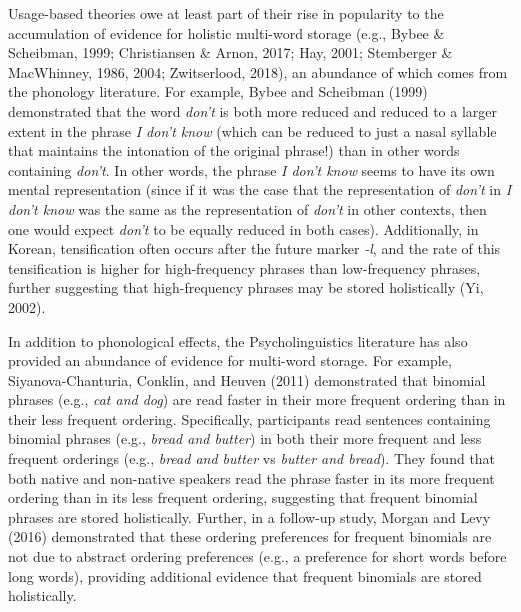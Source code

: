 \documentclass[
  man,floatsintext]{apa6}
\begin{document}
Usage-based theories owe at least part of their rise in popularity to the accumulation of evidence for holistic multi-word storage (e.g., Bybee \& Scheibman, 1999; Christiansen \& Arnon, 2017; Hay, 2001; Stemberger \& MacWhinney, 1986, 2004; Zwitserlood, 2018), an abundance of which comes from the phonology literature. For example, Bybee and Scheibman (1999) demonstrated that the word \emph{don't} is both more reduced and reduced to a larger extent in the phrase \emph{I don't know} (which can be reduced to just a nasal syllable that maintains the intonation of the original phrase!) than in other words containing \emph{don't}. In other words, the phrase \emph{I don't know} seems to have its own mental representation (since if it was the case that the representation of \emph{don't} in \emph{I don't know} was the same as the representation of \emph{don't} in other contexts, then one would expect \emph{don't} to be equally reduced in both cases). Additionally, in Korean, tensification often occurs after the future marker \emph{-l}, and the rate of this tensification is higher for high-frequency phrases than low-frequency phrases, further suggesting that high-frequency phrases may be stored holistically (Yi, 2002).

In addition to phonological effects, the Psycholinguistics literature has also provided an abundance of evidence for multi-word storage. For example, Siyanova-Chanturia, Conklin, and Heuven (2011) demonstrated that binomial phrases (e.g., \emph{cat and dog}) are read faster in their more frequent ordering than in their less frequent ordering. Specifically, participants read sentences containing binomial phrases (e.g., \emph{bread and butter}) in both their more frequent and less frequent orderings (e.g., \emph{bread and butter} vs \emph{butter and bread}). They found that both native and non-native speakers read the phrase faster in its more frequent ordering than in its less frequent ordering, suggesting that frequent binomial phrases are stored holistically. Further, in a follow-up study, Morgan and Levy (2016) demonstrated that these ordering preferences for frequent binomials are not due to abstract ordering preferences (e.g., a preference for short words before long words), providing additional evidence that frequent binomials are stored holistically.
\end{document}
